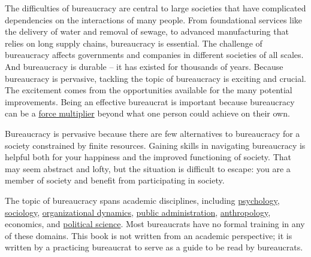 
The difficulties of bureaucracy are central to large societies that have complicated dependencies on the interactions of many people. From foundational services like the delivery of water and removal of sewage, to advanced manufacturing that relies on long supply chains, bureaucracy is essential.  The challenge of bureaucracy affects governments and companies in different societies of all scales. And bureaucracy is durable -- it has existed for thousands of years. Because bureaucracy is pervasive, tackling the topic of bureaucracy is exciting and crucial. The excitement comes from the opportunities available for the many potential improvements.
Being an effective bureaucrat is important because bureaucracy can be a \href{https://en.wikipedia.org/wiki/Force_multiplication}{force multiplier}\iftoggle{WPinmargin}{\marginpar{$>$Wikipedia: Force multiplication}}{}
beyond what one person could achieve on their own.

Bureaucracy is pervasive because there are few alternatives to bureaucracy for a society constrained by finite resources. 
Gaining skills in navigating bureaucracy is helpful both for your happiness and the improved functioning of society. 
That may seem abstract and lofty, but the situation is difficult to escape: you are a member of society and benefit from participating in society. 


The topic of bureaucracy spans academic disciplines, including 
\href{https://en.wikipedia.org/wiki/Psychology}{psychology},
\iftoggle{WPinmargin}{\marginpar{$>$Wikipedia: psychology}}{}
\href{https://en.wikipedia.org/wiki/Sociology}{sociology},
\href{https://en.wikipedia.org/wiki/Organizational_behavior}{organizational dynamics},
\href{https://en.wikipedia.org/wiki/Public_administration}{public administration}, 
\href{https://en.wikipedia.org/wiki/Anthropology}{anthropology},
economics, and  
\href{https://en.wikipedia.org/wiki/Political_science}{political science}. 
Most bureaucrats have no formal training in any of these domains. This book is not written from an academic perspective; it is written by a practicing bureaucrat to serve as a guide to be read by bureaucrats. 



